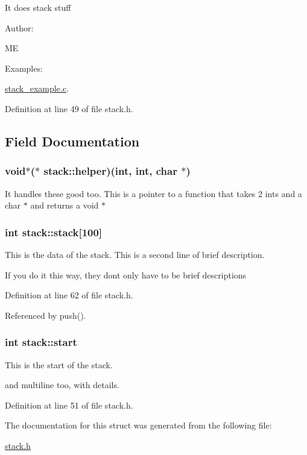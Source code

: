 It does stack stuff \begin{Desc}
\item[Author: ]\par
ME \end{Desc}
\begin{Desc}
\item[Examples: ]\par


\hyperlink{stack__example_8c-example}{stack\_\-example.c}.\end{Desc}




Definition at line 49 of file stack.h.

\subsection{Field Documentation}
\hypertarget{structstack_m4}{
\subsubsection[helper]{\setlength{\rightskip}{0pt plus 5cm}void$\ast$($\ast$ stack::helper)(int, int, char $\ast$)}}
\label{structstack_m4}


It handles these good too.  This is a pointer to a function that takes 2 ints and a char $\ast$  and returns a void $\ast$ \hypertarget{structstack_m2}{
\subsubsection[stack]{\setlength{\rightskip}{0pt plus 5cm}int stack::stack\mbox{[}100\mbox{]}}}
\label{structstack_m2}


This is the data of the stack. This is a second line of brief description.

If you do it this way, they dont only have to be brief descriptions 

Definition at line 62 of file stack.h.

Referenced by push().\hypertarget{structstack_m0}{
\subsubsection[start]{\setlength{\rightskip}{0pt plus 5cm}int stack::start}}
\label{structstack_m0}


This is the start of the stack.

and multiline too, with details. 

Definition at line 51 of file stack.h.

The documentation for this struct was generated from the following file:\begin{CompactItemize}
\item 
\hyperlink{stack_8h}{stack.h}\end{CompactItemize}

